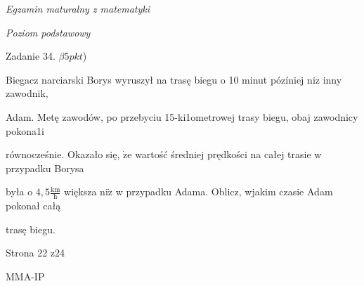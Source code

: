 \documentclass[a4paper,12pt]{article}
\begin{document}
{\it Egzamin maturalny z matematyki}

{\it Poziom podstawowy}

Zadanie 34. $\beta 5pkt$)

Biegacz narciarski Borys wyruszył na trasę biegu o 10 minut pózíniej $\mathrm{n}\mathrm{i}\dot{\mathrm{z}}$ inny zawodnik,

Adam. Metę zawodów, po przebyciu 15-ki1ometrowej trasy biegu, obaj zawodnicy pokona1i

równocześnie. Okazało się, $\dot{\mathrm{z}}\mathrm{e}$ wartość średniej prędkości na całej trasie w przypadku Borysa

była o $4,5 \displaystyle \frac{\mathrm{k}\mathrm{m}}{\mathrm{h}}$ większa $\mathrm{n}\mathrm{i}\dot{\mathrm{z}}$ w przypadku Adama. Oblicz, wjakim czasie Adam pokonał całą

trasę biegu.

Strona 22 z24

MMA-IP
\end{document}
